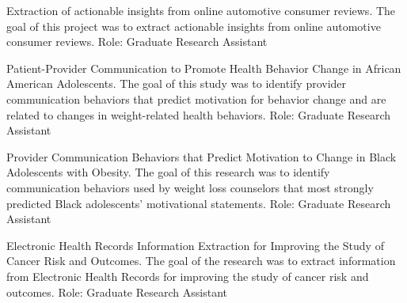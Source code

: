 \documentclass{nihbiosketch}
\begin{document}
{Extraction of actionable insights from online automotive consumer reviews.}
{The goal of this project was to extract actionable insights from online automotive consumer reviews.}
{Role: Graduate Research Assistant}

\bigskip

{Patient-Provider Communication to Promote Health Behavior Change in African American Adolescents.}
{The goal of this study was to identify provider communication behaviors that predict motivation for behavior change and are related to changes in weight-related health behaviors.}
{Role: Graduate Research Assistant}

\bigskip

{Provider Communication Behaviors that Predict Motivation to Change in Black Adolescents with Obesity.}
{The goal of this research was to identify communication behaviors used by weight loss counselors that most strongly predicted Black adolescents’ motivational statements.}
{Role: Graduate Research Assistant}

\bigskip

{Electronic Health Records Information Extraction for Improving the Study of Cancer Risk and Outcomes.}
{The goal of the research was to extract information from Electronic Health Records for improving the study of cancer risk and outcomes.}
{Role: Graduate Research Assistant}
\end{document}
